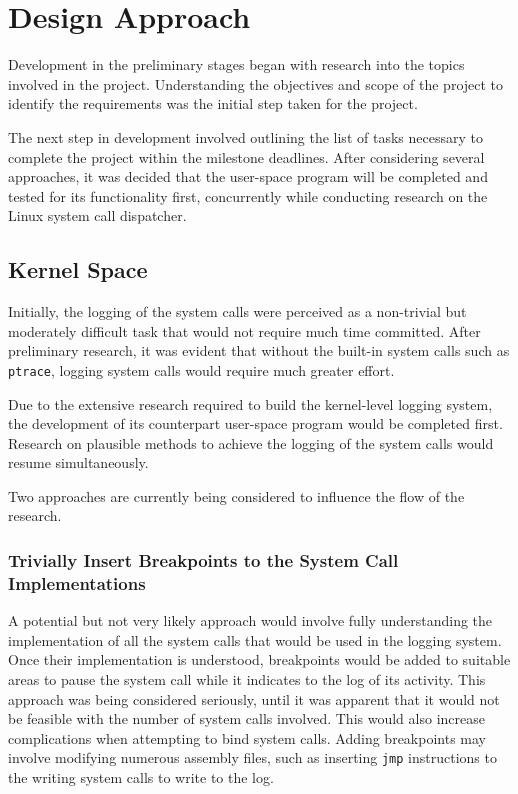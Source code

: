 \documentclass[paper=usletter, fontsize=12pt]{article}
\begin{document}

    

    \section{Design Approach} Development in the preliminary stages began with
    research into the topics involved in the project. Understanding the
    objectives and scope of the project to identify the requirements was the
    initial step taken for the project.

    The next step in development involved outlining the list of tasks necessary
    to complete the project within the milestone deadlines. After considering
    several approaches, it was decided that the user-space program will be
    completed and tested for its functionality first, concurrently while
    conducting research on the Linux system call dispatcher.

    \subsection{Kernel Space} Initially, the logging of the system calls were
    perceived as a non-trivial but moderately difficult task that would not
    require much time committed. After preliminary research, it was evident
    that without the built-in system calls such as \texttt{ptrace}, logging
    system calls would require much greater effort.

    Due to the extensive research required to build the kernel-level logging
    system, the development of its counterpart user-space program would be
    completed first. Research on plausible methods to achieve the logging of
    the system calls would resume simultaneously.

    Two approaches are currently being considered to influence the flow of the
    research.

    \subsubsection{Trivially Insert Breakpoints to the System Call
    Implementations} A potential but not very likely approach would involve
    fully understanding the implementation of all the system calls that would
    be used in the logging system. Once their implementation is understood,
    breakpoints would be added to suitable areas to pause the system call while
    it indicates to the log of its activity. This approach was being considered
    seriously, until it was apparent that it would not be feasible with the
    number of system calls involved. This would also increase complications
    when attempting to bind system calls. Adding breakpoints may involve
    modifying numerous assembly files, such as inserting \texttt{jmp}
    instructions to the writing system calls to write to the log.
\end{document}

